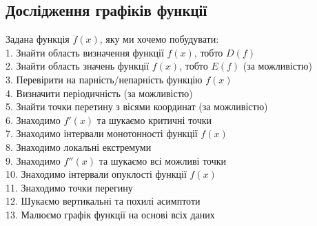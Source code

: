 \documentclass[a4paper, 14pt]{extarticle}
\def\bigline{\vspace{5mm}\\}
\theoremstyle{theoremdd}
\theoremstyle{theoremdd}
\theoremstyle{theoremdd}
\theoremstyle{theoremdd}
\theoremstyle{theoremdd}
\theoremstyle{theoremdd}
\theoremstyle{theoremdd}
\theoremstyle{theoremdd}
\begin{document}
\subsection{Дослідження графіків функції}
Задана функція $f(x)$, яку ми хочемо побудувати:\\
1. Знайти область визначення функції $f(x)$, тобто $D(f)$\\
2. Знайти область значень функції $f(x)$, тобто $E(f)$ (за можливістю)\\
3. Перевірити на парність/непарність функцію $f(x)$\\
4. Визначити періодичність (за можливістю)\\
5. Знайти точки перетину з вісями координат (за можливістю)\\
6. Знаходимо $f'(x)$ та шукаємо критичні точки\\
7. Знаходимо інтервали монотонності функції $f(x)$\\
8. Знаходимо локальні екстремуми\\
9. Знаходимо $f''(x)$ та шукаємо всі можливі точки\\
10. Знаходимо інтервали опуклості функції $f(x)$\\
11. Знаходимо точки перегину\\
12. Шукаємо вертикальні та похилі асимптоти\\
13. Малюємо графік функції на основі всіх даних
\bigline
\end{document}
